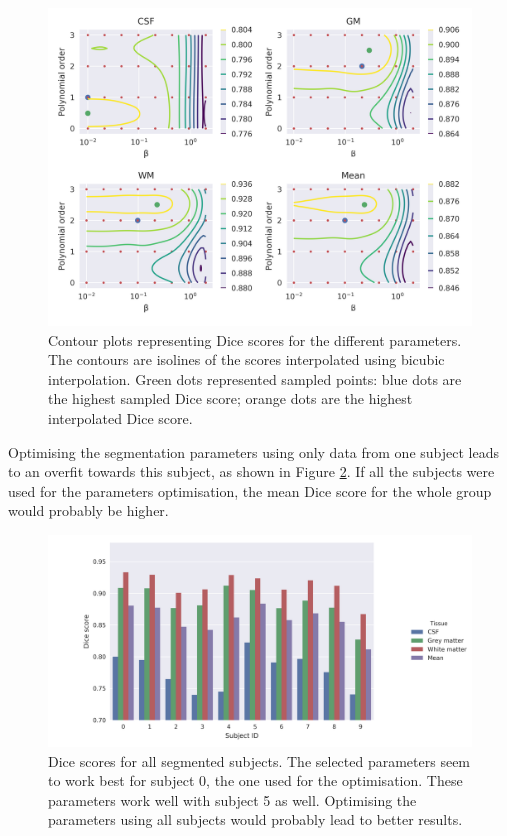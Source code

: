 \begin{figure}
  \centering
  \includegraphics[width=\textwidth]{figures/parameters_dices}
  \caption{Contour plots representing Dice scores for the different parameters. The contours are isolines of the scores interpolated using bicubic interpolation. Green dots represented sampled points: blue dots are the highest sampled Dice score; orange dots are the highest interpolated Dice score.}
  \label{fig:params-optimisation}
\end{figure}



Optimising the segmentation parameters using only data from one subject leads to an overfit towards this subject, as shown in Figure \ref{fig:dices-bars}. If all the subjects were used for the parameters optimisation, the mean Dice score for the whole group would probably be higher.

\begin{figure}
  \centering
  \includegraphics[width=\textwidth]{figures/dices_bars}
  \caption{Dice scores for all segmented subjects. The selected parameters seem to work best for subject 0, the one used for the optimisation. These parameters work well with subject 5 as well. Optimising the parameters using all subjects would probably lead to better results.}
  \label{fig:dices-bars}
\end{figure}
